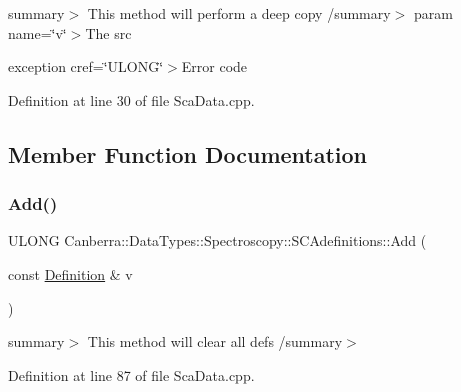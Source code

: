 summary$>$ This method will perform a deep copy /summary$>$ param name=\char`\"{}v\char`\"{}$>$The src

exception cref=\char`\"{}\+U\+L\+O\+N\+G\char`\"{}$>$Error code

Definition at line 30 of file Sca\+Data.\+cpp.



\subsection{Member Function Documentation}
\mbox{\label{class_canberra_1_1_data_types_1_1_spectroscopy_1_1_s_c_adefinitions_ac63b7209e56a1d255af8f6fe2a8f41de_ac63b7209e56a1d255af8f6fe2a8f41de}} 
\subsubsection{\texorpdfstring{Add()}{Add()}}
{\footnotesize\ttfamily U\+L\+O\+NG Canberra\+::\+Data\+Types\+::\+Spectroscopy\+::\+S\+C\+Adefinitions\+::\+Add (\begin{DoxyParamCaption}\item[{const \hyperlink{class_canberra_1_1_data_types_1_1_spectroscopy_1_1_s_c_adefinitions_de/d00/struct_canberra_1_1_data_types_1_1_spectroscopy_1_1_s_c_adefinitions_1_1_definition_tag}{Definition} \&}]{v }\end{DoxyParamCaption})}

summary$>$ This method will clear all defs /summary$>$ 

Definition at line 87 of file Sca\+Data.\+cpp.

\mbox{\label{class_canberra_1_1_data_types_1_1_spectroscopy_1_1_s_c_adefinitions_a4367fc0b1f01840fec0551aac2dfd339_a4367fc0b1f01840fec0551aac2dfd339}} 
